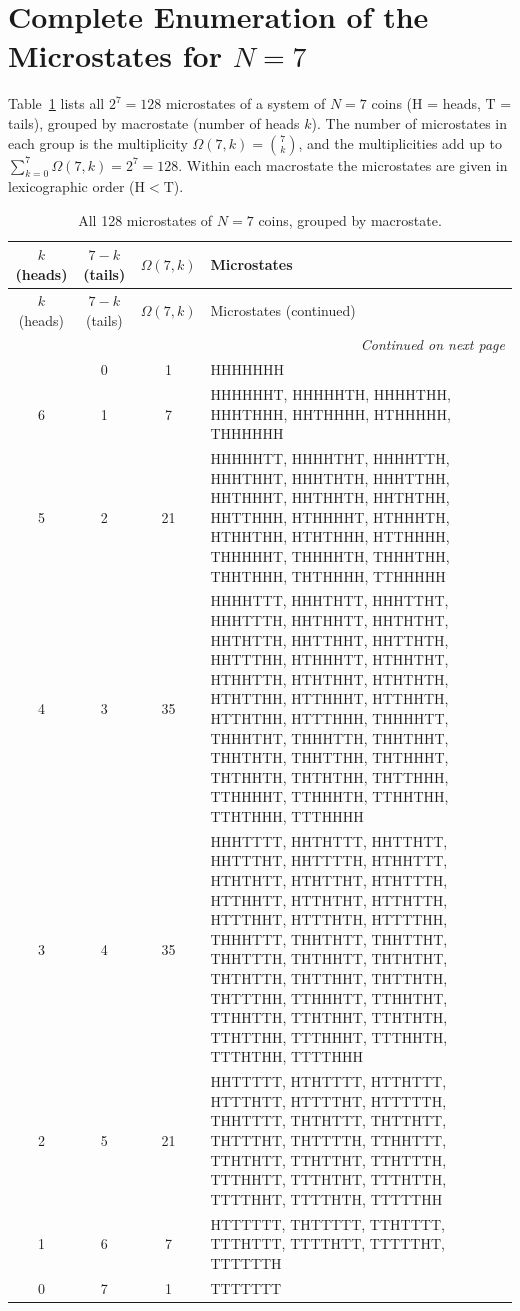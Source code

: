 \documentclass[10pt, a4paper]{article}
\begin{document}
\section{Complete Enumeration of the Microstates for $N=7$}
\label{app:microstates}

Table~\ref{tab:micro7} lists all $2^7=128$ microstates of a system of $N=7$ coins
($\mathrm{H}$ = heads, $\mathrm{T}$ = tails), grouped by macrostate (number of
heads $k$). The number of microstates in each group is the multiplicity
$\Omega(7,k)=\binom{7}{k}$, and the multiplicities add up to
$\sum_{k=0}^{7}\Omega(7,k)=2^7=128$. Within each macrostate the microstates are
given in lexicographic order ($\mathrm{H}<\mathrm{T}$).

{\small
\begin{longtable}{@{}c c c p{}@{}}
\caption{All 128 microstates of $N=7$ coins, grouped by macrostate.}
\label{tab:micro7}\\
\toprule
$k$ (heads) & $7-k$ (tails) & $\Omega(7,k)$ & Microstates \\
\midrule
\endfirsthead
\toprule
$k$ (heads) & $7-k$ (tails) & $\Omega(7,k)$ & Microstates (continued) \\
\midrule
\endhead
\midrule
\multicolumn{4}{r}{\emph{Continued on next page}}\\
\endfoot
\endlastfoot
7 & 0 & 1 & \ttfamily HHHHHHH \\
\midrule
6 & 1 & 7 & \ttfamily HHHHHHT, HHHHHTH, HHHHTHH, HHHTHHH, HHTHHHH, HTHHHHH, THHHHHH \\
\midrule
5 & 2 & 21 & \ttfamily HHHHHTT, HHHHTHT, HHHHTTH, HHHTHHT, HHHTHTH, HHHTTHH, HHTHHHT, HHTHHTH, HHTHTHH, HHTTHHH, HTHHHHT, HTHHHTH, HTHHTHH, HTHTHHH, HTTHHHH, THHHHHT, THHHHTH, THHHTHH, THHTHHH, THTHHHH, TTHHHHH \\
\midrule
4 & 3 & 35 & \ttfamily HHHHTTT, HHHTHTT, HHHTTHT, HHHTTTH, HHTHHTT, HHTHTHT, HHTHTTH, HHTTHHT, HHTTHTH, HHTTTHH, HTHHHTT, HTHHTHT, HTHHTTH, HTHTHHT, HTHTHTH, HTHTTHH, HTTHHHT, HTTHHTH, HTTHTHH, HTTTHHH, THHHHTT, THHHTHT, THHHTTH, THHTHHT, THHTHTH, THHTTHH, THTHHHT, THTHHTH, THTHTHH, THTTHHH, TTHHHHT, TTHHHTH, TTHHTHH, TTHTHHH, TTTHHHH \\
\midrule
3 & 4 & 35 & \ttfamily HHHTTTT, HHTHTTT, HHTTHTT, HHTTTHT, HHTTTTH, HTHHTTT, HTHTHTT, HTHTTHT, HTHTTTH, HTTHHTT, HTTHTHT, HTTHTTH, HTTTHHT, HTTTHTH, HTTTTHH, THHHTTT, THHTHTT, THHTTHT, THHTTTH, THTHHTT, THTHTHT, THTHTTH, THTTHHT, THTTHTH, THTTTHH, TTHHHTT, TTHHTHT, TTHHTTH, TTHTHHT, TTHTHTH, TTHTTHH, TTTHHHT, TTTHHTH, TTTHTHH, TTTTHHH \\
\midrule
2 & 5 & 21 & \ttfamily HHTTTTT, HTHTTTT, HTTHTTT, HTTTHTT, HTTTTHT, HTTTTTH, THHTTTT, THTHTTT, THTTHTT, THTTTHT, THTTTTH, TTHHTTT, TTHTHTT, TTHTTHT, TTHTTTH, TTTHHTT, TTTHTHT, TTTHTTH, TTTTHHT, TTTTHTH, TTTTTHH \\
\midrule
1 & 6 & 7 & \ttfamily HTTTTTT, THTTTTT, TTHTTTT, TTTHTTT, TTTTHTT, TTTTTHT, TTTTTTH \\
\midrule
0 & 7 & 1 & \ttfamily TTTTTTT \\
\bottomrule
\end{longtable}
}
\end{document}
